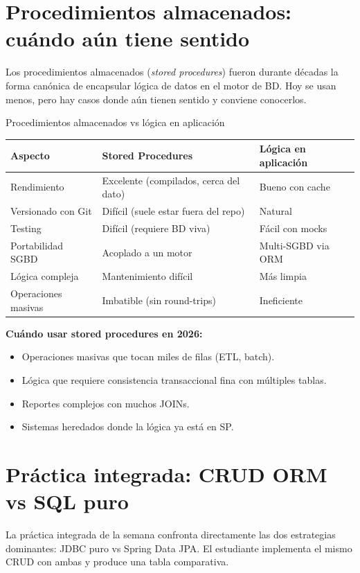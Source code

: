 \documentclass[11pt,a4paper,openany]{book}
\begin{document}
\section{Procedimientos almacenados: cuándo aún tiene sentido}

Los procedimientos almacenados (\emph{stored procedures})
fueron durante décadas la forma canónica de encapsular lógica de
datos en el motor de BD. Hoy se usan menos, pero hay casos donde aún
tienen sentido y conviene conocerlos.


\begin{cajacompara}{Procedimientos almacenados vs lógica en aplicación}
\centering\footnotesize
\begin{tabularx}{\textwidth}{lXX}
\toprule
\textbf{Aspecto} & \textbf{Stored Procedures} & \textbf{Lógica en aplicación}\\
\midrule
Rendimiento & Excelente (compilados, cerca del dato) & Bueno con cache\\
Versionado con Git & Difícil (suele estar fuera del repo) & Natural\\
Testing & Difícil (requiere BD viva) & Fácil con mocks\\
Portabilidad SGBD & Acoplado a un motor & Multi-SGBD via ORM\\
Lógica compleja & Mantenimiento difícil & Más limpia\\
Operaciones masivas & Imbatible (sin round-trips) & Ineficiente\\
\bottomrule
\end{tabularx}
\end{cajacompara}

\textbf{Cuándo usar stored procedures en 2026:}
\begin{itemize}
\item Operaciones masivas que tocan miles de filas (ETL, batch).
\item Lógica que requiere consistencia transaccional fina con
múltiples tablas.
\item Reportes complejos con muchos JOINs.
\item Sistemas heredados donde la lógica ya está en SP.
\end{itemize}

\section{Práctica integrada: CRUD ORM vs SQL puro}

La práctica integrada de la semana confronta directamente
las dos estrategias dominantes: JDBC puro vs Spring Data JPA. El
estudiante implementa el mismo CRUD con ambas y produce una tabla
comparativa.
\end{document}
